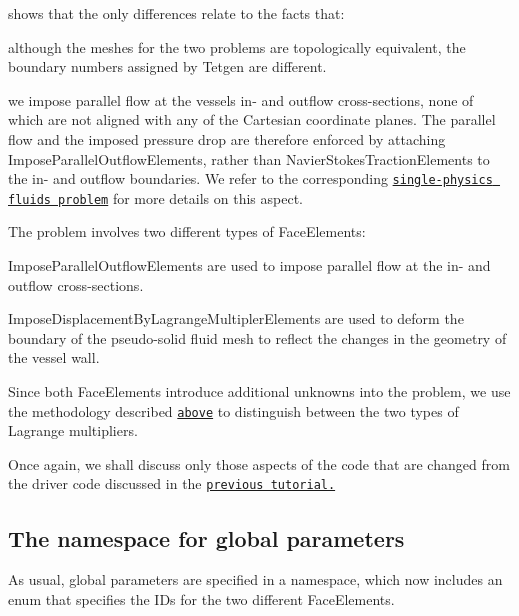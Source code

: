 shows that the only differences relate to the facts that\+:
\begin{DoxyItemize}
\item although the meshes for the two problems are topologically equivalent, the boundary numbers assigned by {\ttfamily Tetgen} are different.
\item we impose parallel flow at the vessel\textquotesingle{}s in-\/ and outflow cross-\/sections, none of which are not aligned with any of the Cartesian coordinate planes. The parallel flow and the imposed pressure drop are therefore enforced by attaching {\ttfamily Impose\+Parallel\+Outflow\+Elements}, rather than {\ttfamily Navier\+Stokes\+Traction\+Elements} to the in-\/ and outflow boundaries. We refer to the corresponding \href{../../../navier_stokes/vmtk_fluid/html/index.html#parallel_flow}{\tt single-\/physics fluids problem} for more details on this aspect.
\item The problem involves two different types of {\ttfamily Face\+Elements\+:} 
\begin{DoxyItemize}
\item {\ttfamily Impose\+Parallel\+Outflow\+Elements} are used to impose parallel flow at the in-\/ and outflow cross-\/sections.
\item {\ttfamily Impose\+Displacement\+By\+Lagrange\+Multipler\+Elements} are used to deform the boundary of the pseudo-\/solid fluid mesh to reflect the changes in the geometry of the vessel wall.
\end{DoxyItemize}Since both {\ttfamily Face\+Elements} introduce additional unknowns into the problem, we use the methodology described \href{#face}{\tt above} to distinguish between the two types of Lagrange multipliers.
\end{DoxyItemize}

Once again, we shall discuss only those aspects of the code that are changed from the driver code discussed in the \href{../../unstructured_three_d_fsi/html/index.html}{\tt previous tutorial.}



\hypertarget{index_namespace}{}\subsection{The namespace for global parameters}\label{index_namespace}
As usual, global parameters are specified in a namespace, which now includes an {\ttfamily enum} that specifies the I\+Ds for the two different {\ttfamily Face\+Elements}.

